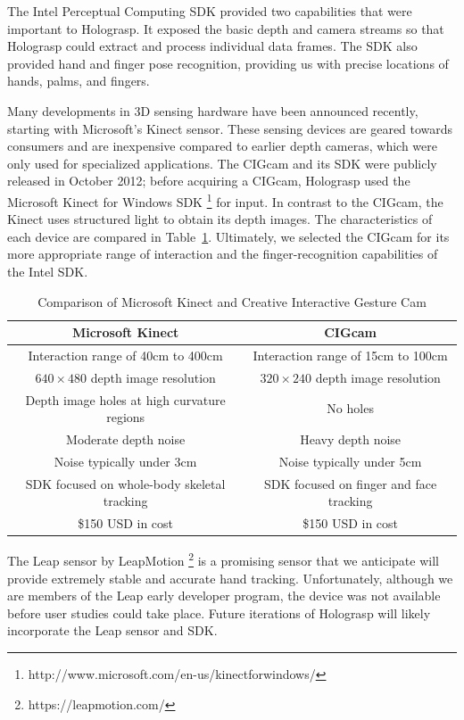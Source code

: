 \documentclass[pageno]{jpaper}
\begin{document}
The Intel Perceptual Computing SDK provided two capabilities that were important to Holograsp. It exposed the basic depth and 
camera streams so that Holograsp could extract and process individual data frames. The SDK also provided
hand and finger pose recognition, providing us with precise locations of hands, palms, and fingers.

Many developments in 3D sensing hardware have been announced recently, starting with Microsoft's Kinect sensor. These sensing
devices are geared towards consumers and are inexpensive compared to earlier depth cameras, which were only used for specialized applications.
The CIGcam and its SDK were publicly released in October 2012; before acquiring a CIGcam, Holograsp used the Microsoft Kinect for Windows SDK
\footnote{http://www.microsoft.com/en-us/kinectforwindows/} for input. In contrast to the CIGcam, the Kinect uses structured light
to obtain its depth images. The characteristics of each device are compared in Table~\ref{tab:comparison}.
Ultimately, we selected the CIGcam for its more appropriate range of interaction and the finger-recognition
capabilities of the Intel SDK.


\begin{table}[H]
\begin{tabular}{|c|c|}
\hline
{\bf Microsoft Kinect} & {\bf CIGcam} \\ \hline
Interaction range of 40cm to 400cm & Interaction range of 15cm to 100cm \\
$640 \times 480$ depth image resolution & $320 \times 240$ depth image resolution \\
Depth image holes at high curvature regions & No holes \\
Moderate depth noise & Heavy depth noise \\
Noise typically under 3cm & Noise typically under 5cm \\
SDK focused on whole-body skeletal tracking & SDK focused on finger and face tracking \\
\$150 USD in cost & \$150 USD in cost \\
\hline
\end{tabular}
\caption{Comparison of Microsoft Kinect and Creative Interactive Gesture Cam}
\label{tab:comparison}
\end{table}

The Leap sensor by LeapMotion \footnote{https://leapmotion.com/} is a promising sensor that we anticipate will provide extremely stable and
accurate hand tracking. Unfortunately, although we are members of the Leap early developer program, the device was not available
before user studies could take place. Future iterations of Holograsp will likely incorporate the Leap sensor and SDK.
\end{document}
